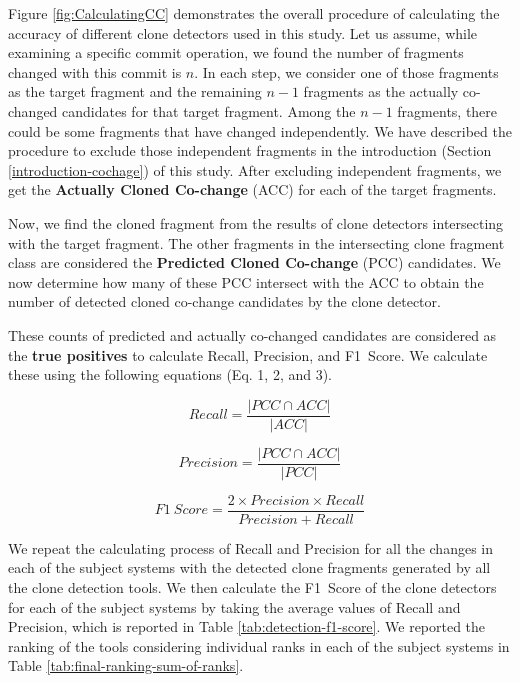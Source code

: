 \documentclass[review]{elsarticle}
\begin{document}
Figure \ref{fig:CalculatingCC} demonstrates the overall procedure of calculating the accuracy of different clone detectors used in this study. Let us assume, while examining a specific commit operation, we found the number of fragments changed with this commit is $n$. In each step, we consider one of those fragments as the target fragment and the remaining $n-1$ fragments as the actually co-changed candidates for that target fragment. Among the $n-1$ fragments, there could be some fragments that have changed independently. We have described the procedure to exclude those independent fragments in the introduction (Section \ref{introduction-cochage}) of this study. After excluding independent fragments, we get the \textbf{Actually Cloned Co-change} (ACC) for each of the target fragments. 

Now, we find the cloned fragment from the results of clone detectors intersecting with the target fragment. The other fragments in the intersecting clone fragment class are considered the \textbf{Predicted Cloned Co-change} (PCC) candidates. We now determine how many of these PCC intersect with the ACC to obtain the number of detected cloned co-change candidates by the clone detector. 

These counts of predicted and actually co-changed candidates are considered as the \textbf{true positives} to calculate Recall, Precision, and F1~Score. We calculate these using the following equations (Eq. 1, 2, and 3). 

\begin{equation}
    Recall = \frac{|PCC \cap ACC|}{|ACC|}
\end{equation}

\begin{equation}
    Precision = \frac{|PCC \cap ACC|}{|PCC|}
\end{equation}

\begin{equation}
\label{eq-f1-score}
    F1~Score = \frac{2 \times Precision \times Recall}{Precision + Recall}
\end{equation}

\vspace{1mm}
We repeat the calculating process of Recall and Precision for all the changes in each of the subject systems with the detected clone fragments generated by all the clone detection tools. We then calculate the F1~Score of the clone detectors for each of the subject systems by taking the average values of Recall and Precision, which is reported in Table \ref{tab:detection-f1-score}. We reported the ranking of the tools considering individual ranks in each of the subject systems in Table \ref{tab:final-ranking-sum-of-ranks}.
\end{document}
